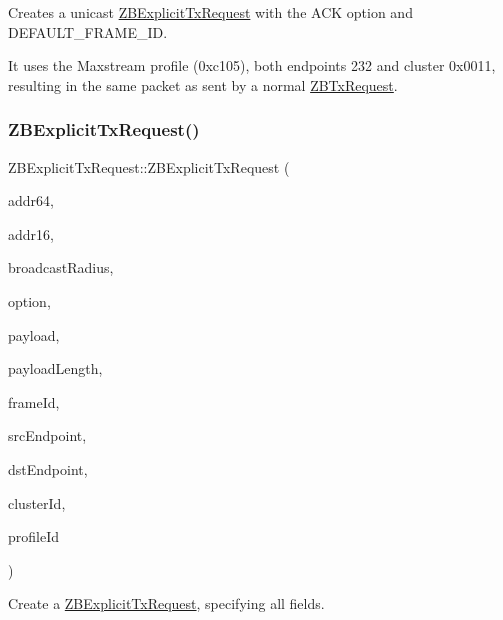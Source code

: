 Creates a unicast \hyperlink{class_z_b_explicit_tx_request}{Z\+B\+Explicit\+Tx\+Request} with the A\+CK option and D\+E\+F\+A\+U\+L\+T\+\_\+\+F\+R\+A\+M\+E\+\_\+\+ID.

It uses the Maxstream profile (0xc105), both endpoints 232 and cluster 0x0011, resulting in the same packet as sent by a normal \hyperlink{class_z_b_tx_request}{Z\+B\+Tx\+Request}. \hypertarget{class_z_b_explicit_tx_request_ab7c5910a9655e897cf4534091f368e17}{}\label{class_z_b_explicit_tx_request_ab7c5910a9655e897cf4534091f368e17} 
\subsubsection{\texorpdfstring{Z\+B\+Explicit\+Tx\+Request()}{ZBExplicitTxRequest()}\hspace{0.1cm}{\footnotesize\ttfamily [2/3]}}
{\footnotesize\ttfamily Z\+B\+Explicit\+Tx\+Request\+::\+Z\+B\+Explicit\+Tx\+Request (\begin{DoxyParamCaption}\item[{\hyperlink{class_x_bee_address64}{X\+Bee\+Address64} \&}]{addr64,  }\item[{uint16\+\_\+t}]{addr16,  }\item[{uint8\+\_\+t}]{broadcast\+Radius,  }\item[{uint8\+\_\+t}]{option,  }\item[{uint8\+\_\+t $\ast$}]{payload,  }\item[{uint8\+\_\+t}]{payload\+Length,  }\item[{uint8\+\_\+t}]{frame\+Id,  }\item[{uint8\+\_\+t}]{src\+Endpoint,  }\item[{uint8\+\_\+t}]{dst\+Endpoint,  }\item[{uint16\+\_\+t}]{cluster\+Id,  }\item[{uint16\+\_\+t}]{profile\+Id }\end{DoxyParamCaption})}

Create a \hyperlink{class_z_b_explicit_tx_request}{Z\+B\+Explicit\+Tx\+Request}, specifying all fields. \hypertarget{class_z_b_explicit_tx_request_a5bcc41ae8c0506c80a0b670e6f032f2a}{}\label{class_z_b_explicit_tx_request_a5bcc41ae8c0506c80a0b670e6f032f2a} 
